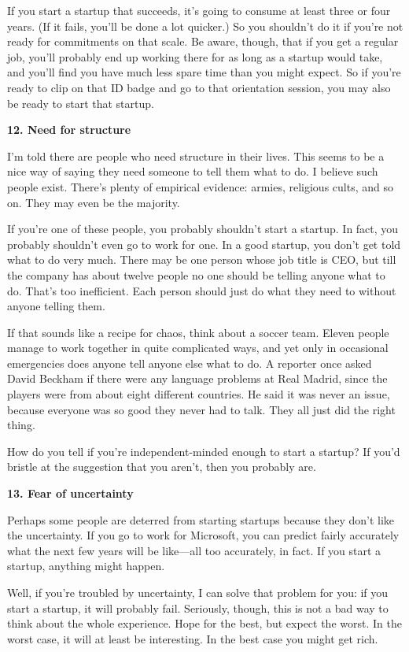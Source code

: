 If you start a startup that succeeds, it's going to consume at least
three or four years. (If it fails, you'll be done a lot quicker.) So you
shouldn't do it if you're not ready for commitments on that scale. Be
aware, though, that if you get a regular job, you'll probably end up
working there for as long as a startup would take, and you'll find you
have much less spare time than you might expect. So if you're ready to
clip on that ID badge and go to that orientation session, you may also
be ready to start that startup.

\textbf{12. Need for structure}

I'm told there are people who need structure in their lives. This seems
to be a nice way of saying they need someone to tell them what to do. I
believe such people exist. There's plenty of empirical evidence: armies,
religious cults, and so on. They may even be the majority.

If you're one of these people, you probably shouldn't start a startup.
In fact, you probably shouldn't even go to work for one. In a good
startup, you don't get told what to do very much. There may be one
person whose job title is CEO, but till the company has about twelve
people no one should be telling anyone what to do. That's too
inefficient. Each person should just do what they need to without anyone
telling them.

If that sounds like a recipe for chaos, think about a soccer team.
Eleven people manage to work together in quite complicated ways, and yet
only in occasional emergencies does anyone tell anyone else what to do.
A reporter once asked David Beckham if there were any language problems
at Real Madrid, since the players were from about eight different
countries. He said it was never an issue, because everyone was so good
they never had to talk. They all just did the right thing.

How do you tell if you're independent-minded enough to start a startup?
If you'd bristle at the suggestion that you aren't, then you probably
are.

\textbf{13. Fear of uncertainty}

Perhaps some people are deterred from starting startups because they
don't like the uncertainty. If you go to work for Microsoft, you can
predict fairly accurately what the next few years will be like---all too
accurately, in fact. If you start a startup, anything might happen.

Well, if you're troubled by uncertainty, I can solve that problem for
you: if you start a startup, it will probably fail. Seriously, though,
this is not a bad way to think about the whole experience. Hope for the
best, but expect the worst. In the worst case, it will at least be
interesting. In the best case you might get rich.

